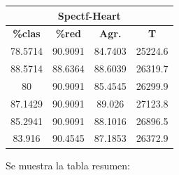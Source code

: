 \documentclass[11pt,a4paper]{article}
\theoremstyle{definition}
\begin{document}
\begin{tabbing}
{		\begin{tabular}{|c|c|c|c|}
			\hline
			\multicolumn{4}{|c|}{\textbf{Spectf-Heart}} \\ \hline
			\textbf{\%clas} & \textbf{\%red} & \textbf{Agr.} & \textbf{T} \\ \hline 
			78.5714 & 90.9091 & 84.7403 & 25224.6 \\ \hline
88.5714 & 88.6364 & 88.6039 & 26319.7 \\ \hline
80 & 90.9091 & 85.4545 & 26299.9 \\ \hline
87.1429 & 90.9091 & 89.026 & 27123.8 \\ \hline
85.2941 & 90.9091 & 88.1016 & 26896.5 \\ \hline
83.916 & 90.4545 & 87.1853 & 26372.9 \\ \hline
		\end{tabular}
		}
	\end{tabbing}
	\fi
	
	Se muestra la tabla resumen:
	
\end{document}
